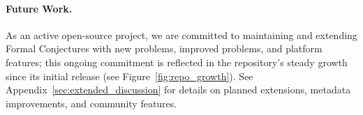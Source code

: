 \paragraph{Future Work.}
As an active open-source project, we are committed to maintaining and extending Formal Conjectures with new problems, improved problems, and platform features; this ongoing commitment is reflected in the repository's steady growth since its initial release (see Figure~\ref{fig:repo_growth}).
See Appendix~\ref{sec:extended_discussion} for details on planned extensions, metadata improvements, and community features.

